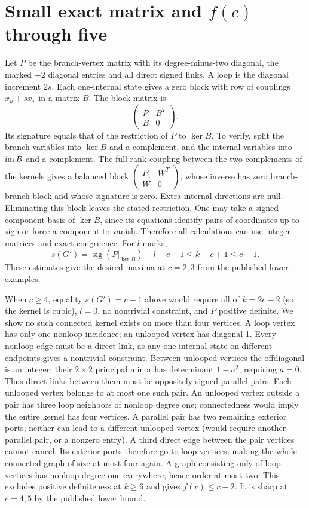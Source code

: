 \documentclass[11pt]{article}
\begin{document}
\section{\texorpdfstring{Small exact matrix and \(f(c)\) through five}{Small exact matrix and f(c) through five}}\label{small-exact-matrix-and-fc-through-five}

Let \(P\) be the branch-vertex matrix with its degree-minus-two diagonal, the marked \(+2\) diagonal entries and all direct signed links. A loop is the diagonal increment \(2s\). Each one-internal state gives a zero block with row of couplings \(x_u+sx_v\) in a matrix \(B\). The block matrix is
\[
\begin{pmatrix}P&B^T\\B&0\end{pmatrix}.
\]
Its signature equals that of the restriction of \(P\) to \(\ker B\). To verify, split the branch variables into \(\ker B\) and a complement, and the internal variables into \({\rm im}\,B\) and a complement. The full-rank coupling between the two complements of the kernels gives a balanced block \(\left(\begin{smallmatrix}P_1&W^T\\W&0\end{smallmatrix}\right)\), whose inverse has zero branch-branch block and whose signature is zero. Extra internal directions are null. Eliminating this block leaves the stated restriction. One may take a signed-component basis of \(\ker B\), since its equations identify pairs of coordinates up to sign or force a component to vanish. Therefore all calculations can use integer matrices and exact congruence. For \(l\) marks,
\[
s(G')=\operatorname{sig}(P|_{\ker B})-l-c+1\le  k-c+1\le  c-1.
\]
These estimates give the desired maxima at \(c=2,3\) from the published lower examples.

When \(c\ge 4\), equality \(s(G')=c-1\) above would require all of \(k=2c-2\) (so the kernel is cubic), \(l=0\), no nontrivial constraint, and \(P\) positive definite. We show no such connected kernel exists on more than four vertices. A loop vertex has only one nonloop incidence; an unlooped vertex has diagonal 1. Every nonloop edge must be a direct link, as any one-internal state on different endpoints gives a nontrivial constraint. Between unlooped vertices the offdiagonal is an integer; their \(2\times2\) principal minor has determinant \(1-a^2\), requiring \(a=0\). Thus direct links between them must be oppositely signed parallel pairs. Each unlooped vertex belongs to at most one such pair. An unlooped vertex outside a pair has three loop neighbors of nonloop degree one; connectedness would imply the entire kernel has four vertices. A parallel pair has two remaining exterior ports; neither can lead to a different unlooped vertex (would require another parallel pair, or a nonzero entry). A third direct edge between the pair vertices cannot cancel. Its exterior ports therefore go to loop vertices, making the whole connected graph of size at most four again. A graph consisting only of loop vertices has nonloop degree one everywhere, hence order at most two. This excludes positive definiteness at \(k\ge 6\) and gives \(f(c)\le  c-2\). It is sharp at \(c=4,5\) by the published lower bound.
\end{document}
